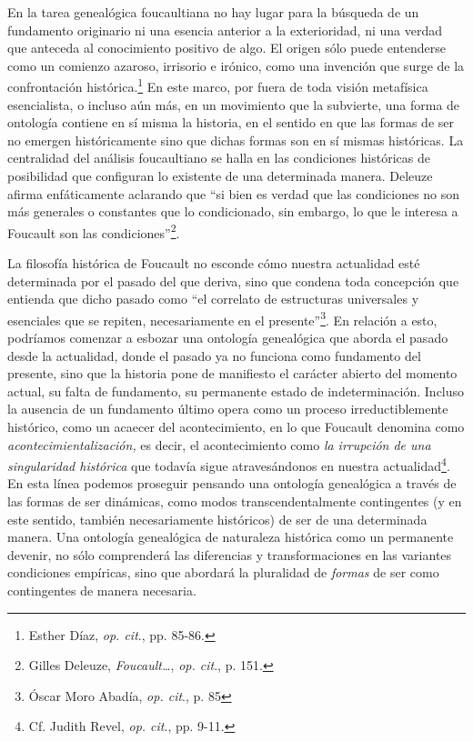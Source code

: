 En la tarea genealógica foucaultiana no hay lugar para la búsqueda de un fundamento originario ni una esencia anterior a la exterioridad, ni una verdad que anteceda al conocimiento positivo de algo. El origen sólo puede entenderse como un comienzo azaroso, irrisorio e irónico, como una invención que surge de la confrontación histórica.\footnote{Esther Díaz, \emph{op. cit}., pp. 85-86.} En este marco, por fuera de toda visión metafísica esencialista, o incluso aún más, en un movimiento que la subvierte, una forma de ontología contiene en sí misma la historia, en el sentido en que las formas de ser no emergen históricamente sino que dichas formas son en sí mismas históricas. La centralidad del análisis foucaultiano se halla en las condiciones históricas de posibilidad que configuran lo existente de una determinada manera. Deleuze afirma enfáticamente aclarando que \enquote{si bien es verdad que las condiciones no son más generales o constantes que lo condicionado, sin embargo, lo que le interesa a Foucault son las condiciones}\footnote{Gilles Deleuze, \emph{Foucault\ldots{}}, \emph{op. cit}., p. 151.}.

La filosofía histórica de Foucault no esconde cómo nuestra actualidad esté determinada por el pasado del que deriva, sino que condena toda concepción que entienda que dicho pasado como \enquote{el correlato de estructuras universales y esenciales que se repiten, necesariamente en el presente}\footnote{Óscar Moro Abadía, \emph{op. cit}., p. 85}. En relación a esto, podríamos comenzar a esbozar una ontología genealógica que aborda el pasado desde la actualidad, donde el pasado ya no funciona como fundamento del presente, sino que la historia pone de manifiesto el carácter abierto del momento actual, su falta de fundamento, su permanente estado de indeterminación. Incluso la ausencia de un fundamento último opera como un proceso irreductiblemente histórico, como un acaecer del acontecimiento, en lo que Foucault denomina como \emph{acontecimientalización,} es decir, el acontecimiento como \emph{la irrupción de una singularidad histórica} que todavía sigue atravesándonos en nuestra actualidad\footnote{Cf. Judith Revel, \emph{op. cit}., pp. 9-11.}. En esta línea podemos proseguir pensando una ontología genealógica a través de las formas de ser dinámicas, como modos transcendentalmente contingentes (y en este sentido, también necesariamente históricos) de ser de una determinada manera. Una ontología genealógica de naturaleza histórica como un permanente devenir, no sólo comprenderá las diferencias y transformaciones en las variantes condiciones empíricas, sino que abordará la pluralidad de \emph{formas} de ser como contingentes de manera necesaria.

